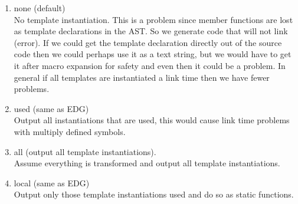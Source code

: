 {\begin{enumerate}
   \item none (default) \\
         No template instantiation. This is a problem since member functions are lost as
         template declarations in the AST.  So we generate code that will not link
         (error).  If we could get the template declaration directly out of the source
         code then we could perhaps use it as a text string, but we would have to get it
         after macro expansion for safety and even then it could be a problem. In general
         if all templates are instantiated a link time then we have fewer problems.
   \item used (same as EDG) \\
         Output all instantiations that are used, this would cause link time problems with
         multiply defined symbols.
   \item all (output all template instantiations). \\
         Assume everything is transformed and output all template instantiations.
   \item local (same as EDG) \\
         Output only those template instantiations used and do so as static functions.         
\end{enumerate}
}


